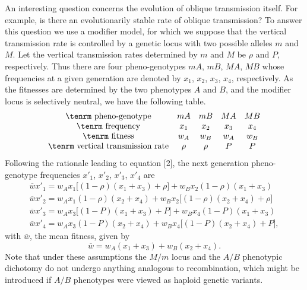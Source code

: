 \documentclass[9pt,twocolumn,twoside,lineno]{pnas-new}
\begin{document}
 An interesting question concerns the evolution of oblique transmission itself. For example, is there an evolutionarily stable rate of oblique transmission? To answer this question we use a modifier model, for which we suppose that the vertical transmission rate is controlled by a genetic locus with two possible alleles $m$ and $M$. Let the vertical transmission rates determined by $m$ and $M$ be $\rho$ and $P$, respectively. Thus there are four pheno-genotypes $mA$, $mB$, $MA$, $MB$ whose frequencies at a given generation are denoted by $x_1$, $x_2$, $x_3$, $x_4$, respectively. As the fitnesses are determined by the two phenotypes $A$ and $B$, and the modifier locus is selectively neutral, we have the following table.
 \begin{equation}
 \begin{array}{ccccc}
 \hbox{\tenrm pheno-genotype}&mA&mB&MA&MB\\
 \hbox{\tenrm frequency}&x_1&x_2&x_3&x_4\\
 \hbox{\tenrm fitness}&w_A&w_B&w_A&w_B\\
 \hbox{\tenrm vertical transmission rate}&\rho&\rho&P&P
 \end{array}\label{31}\end{equation}
 Following the rationale leading to equation [2], the next generation pheno-genotype frequencies $x'_1$, $x'_2$, $x'_3$, $x'_4$ are
\begin{equation}
\begin{array}{l}
\overline wx'_1 = w_Ax_1\bigl[(1-\rho)(x_1+x_3) +\rho\bigr] +w_Bx_2(1-\rho)(x_1+x_3)\\
 \overline wx'_2 = w_Ax_1(1-\rho)(x_2+x_4) +w_Bx_2\bigl[(1-\rho)(x_2+x_4)+\rho\bigr]\\ 
  \overline wx'_3 = w_Ax_3\bigl[(1-P)(x_1+x_3) +P\bigr] +w_Bx_4(1-P)(x_1+x_3)\\
\overline wx'_4 = w_Ax_3(1-P)(x_2+x_4) +w_Bx_4\bigl[(1-P)(x_2+x_4)+P\bigr], 
\end{array}\label{32}\end{equation}
with $\overline w$, the mean fitness, given by
\begin{equation}
\overline w =w_A(x_1+x_3) +w_B(x_2+x_4).
\label{33}\end{equation}
Note that under these assumptions the $M/m$ locus and the $A/B$ phenotypic dichotomy do not undergo anything analogous to recombination, which might be introduced if $A/B$ phenotypes were viewed as haploid genetic variants. 
\end{document}
